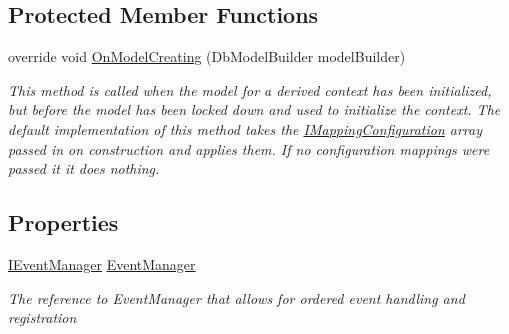 \subsection*{Protected Member Functions}
\begin{DoxyCompactItemize}
\item 
override void \hyperlink{class_highway_1_1_data_1_1_data_context_a54336e47c20e2eb8b4e93e00ffa79a2a}{On\-Model\-Creating} (Db\-Model\-Builder model\-Builder)
\begin{DoxyCompactList}\small\item\em This method is called when the model for a derived context has been initialized, but before the model has been locked down and used to initialize the context. The default implementation of this method takes the \hyperlink{interface_highway_1_1_data_1_1_i_mapping_configuration}{I\-Mapping\-Configuration} array passed in on construction and applies them. If no configuration mappings were passed it it does nothing. \end{DoxyCompactList}\end{DoxyCompactItemize}
\subsection*{Properties}
\begin{DoxyCompactItemize}
\item 
\hyperlink{interface_highway_1_1_data_1_1_interfaces_1_1_i_event_manager}{I\-Event\-Manager} \hyperlink{class_highway_1_1_data_1_1_data_context_aebad01f13573f0ec22ab8a388c3093fd}{Event\-Manager}
\begin{DoxyCompactList}\small\item\em The reference to Event\-Manager that allows for ordered event handling and registration \end{DoxyCompactList}\end{DoxyCompactItemize}
